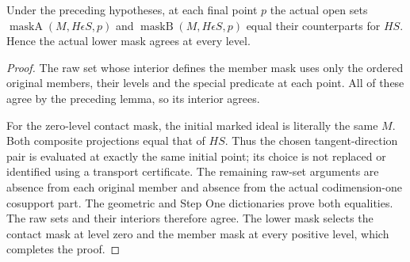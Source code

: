\begin{lemma}
\label{hir:original-interior-empty-masks}
\leanok
{}
Under the preceding hypotheses, at each final point $p$ the actual open sets
$\operatorname{maskA}(M,H\epsilon S,p)$ and
$\operatorname{maskB}(M,H\epsilon S,p)$ equal their counterparts for $HS$.
Hence the actual lower mask agrees at every level.
\end{lemma}
\begin{proof}
The raw set whose interior defines the member mask uses only the ordered
original members, their levels and the special predicate at each point.
All of these agree by the preceding lemma, so its interior agrees.

For the zero-level contact mask, the initial marked ideal is literally the
same $M$.  Both composite projections equal that of $HS$.  Thus the chosen
tangent-direction pair is evaluated at exactly the same initial point; its
choice is not replaced or identified using a transport certificate.  The
remaining raw-set arguments are absence from each original member and
absence from the actual codimension-one cosupport part.  The geometric and
Step One dictionaries prove both equalities.  The raw sets and their interiors
therefore agree.  The lower mask selects the contact mask at level zero and
the member mask at every positive level, which completes the proof.
\end{proof}

